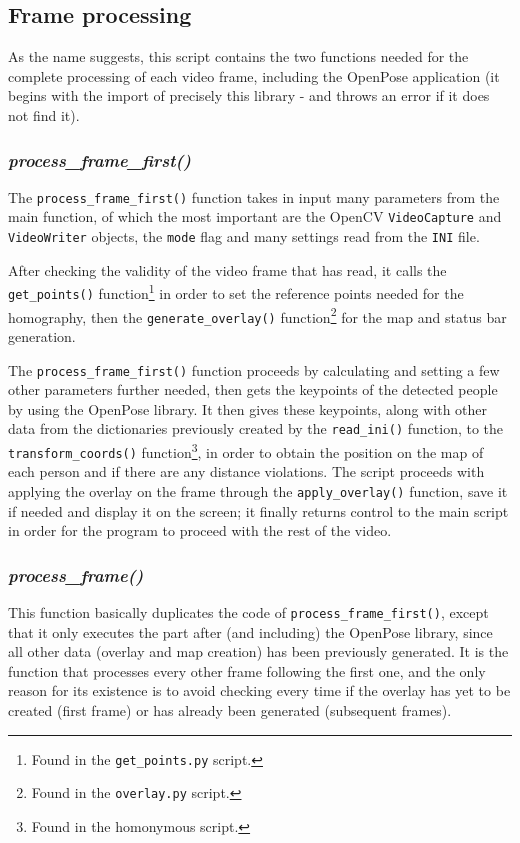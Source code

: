 \documentclass[12pt]{article}
\begin{document}

\subsection{Frame processing}
\label{chap:frameprocess}
As the name suggests, this script contains the two functions needed for the complete processing of each video frame, including the OpenPose application (it begins with the import of precisely this library - and throws an error if it does not find it).

\subsubsection{\textit{process\_frame\_first()}}
\label{chap:processframefirst}
The \lstinline{process_frame_first()} function takes in input many parameters from the main function, of which the most important are the OpenCV \lstinline{VideoCapture} and \lstinline{VideoWriter} objects, the \lstinline{mode} flag and many settings read from the \lstinline{INI} file.

After checking the validity of the video frame that has read, it calls the \lstinline{get_points()} function\footnote{Found in the \lstinline{get_points.py} script.} in order to set the reference points needed for the homography, then the \lstinline{generate_overlay()} function\footnote{\label{overlaynote}Found in the \lstinline{overlay.py} script.} for the map and status bar generation.

The \lstinline{process_frame_first()} function proceeds by calculating and setting a few other parameters further needed, then gets the keypoints of the detected people by using the OpenPose library. It then gives these keypoints, along with other data from the dictionaries previously created by the \lstinline{read_ini()} function, to the \lstinline{transform_coords()} function\footnote{Found in the homonymous script.}, in order to obtain the position on the map of each person and if there are any distance violations. The script proceeds with applying the overlay on the frame through the \lstinline{apply_overlay()} function, save it if needed and display it on the screen; it finally returns control to the main script in order for the program to proceed with the rest of the video.

\subsubsection{\textit{process\_frame()}}
\label{chap:processframe}
This function basically duplicates the code of \lstinline{process_frame_first()}, except that it only executes the part after (and including) the OpenPose library, since all other data (overlay and map creation) has been previously generated. It is the function that processes every other frame following the first one, and the only reason for its existence is to avoid checking every time if the overlay has yet to be created (first frame) or has already been generated (subsequent frames).
\end{document}
